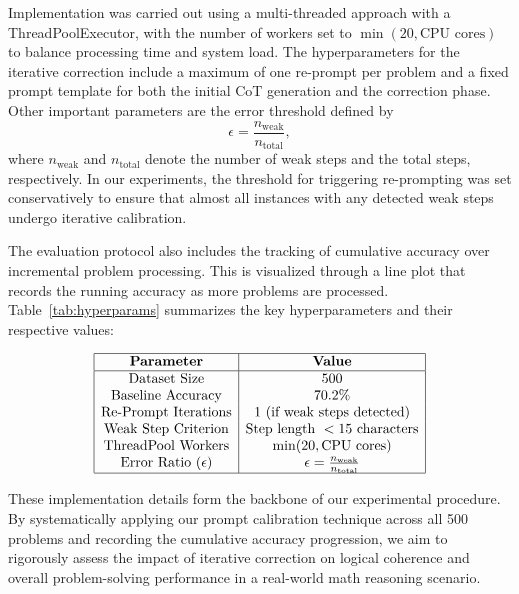 \documentclass[11pt]{article}
\begin{document}
Implementation was carried out using a multi-threaded approach with a ThreadPoolExecutor, with the number of workers set to \(\min(20, \text{CPU cores})\) to balance processing time and system load. The hyperparameters for the iterative correction include a maximum of one re-prompt per problem and a fixed prompt template for both the initial CoT generation and the correction phase. Other important parameters are the error threshold defined by 
\[
\epsilon = \frac{n_{\text{weak}}}{n_{\text{total}}},
\]
where \(n_{\text{weak}}\) and \(n_{\text{total}}\) denote the number of weak steps and the total steps, respectively. In our experiments, the threshold for triggering re-prompting was set conservatively to ensure that almost all instances with any detected weak steps undergo iterative calibration.

The evaluation protocol also includes the tracking of cumulative accuracy over incremental problem processing. This is visualized through a line plot that records the running accuracy as more problems are processed. Table~\ref{tab:hyperparams} summarizes the key hyperparameters and their respective values:

\[
\begin{array}{|c|c|}
\hline
\textbf{Parameter} & \textbf{Value} \\
\hline
\text{Dataset Size} & 500\\
\text{Baseline Accuracy} & 70.2\%\\
\text{Re-Prompt Iterations} & 1\text{ (if weak steps detected)}\\
\text{Weak Step Criterion} & \text{Step length } < 15 \text{ characters}\\
\text{ThreadPool Workers} & \min(20, \text{CPU cores}) \\
\text{Error Ratio } (\epsilon) & \epsilon = \frac{n_{\text{weak}}}{n_{\text{total}}}\\
\hline
\end{array}
\]

These implementation details form the backbone of our experimental procedure. By systematically applying our prompt calibration technique across all 500 problems and recording the cumulative accuracy progression, we aim to rigorously assess the impact of iterative correction on logical coherence and overall problem-solving performance in a real-world math reasoning scenario.
\end{document}
